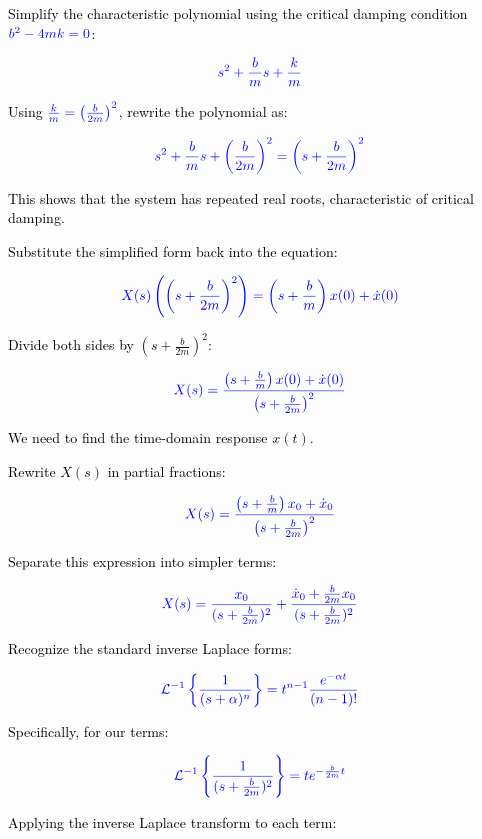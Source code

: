 \documentclass{article}
\begin{document}
\noindent
\textcolor{black}{Simplify the characteristic polynomial using the critical damping condition \(\textcolor{blue}{b^2 - 4mk = 0}\):}

\[
	\textcolor{blue}{s^2 + \frac{b}{m}s + \frac{k}{m}}
\]

\noindent
\textcolor{black}{Using \(\textcolor{blue}{\frac{k}{m} = \left(\frac{b}{2m}\right)^2}\), rewrite the polynomial as:}

\[
	\textcolor{blue}{s^2 + \frac{b}{m}s + \left(\frac{b}{2m}\right)^2 = \left(s + \frac{b}{2m}\right)^2}
\]

\noindent
\textcolor{black}{This shows that the system has repeated real roots, characteristic of critical damping.}

\noindent
\textcolor{black}{Substitute the simplified form back into the equation:}

\[
	\textcolor{blue}{X(s) \left( \left(s + \frac{b}{2m}\right)^2 \right) = \left(s + \frac{b}{m}\right)x(0) + \dot{x}(0)}
\]

\noindent
\textcolor{black}{Divide both sides by \(\left(s + \frac{b}{2m}\right)^2\):}

\[
	\textcolor{blue}{X(s) = \frac{\left(s + \frac{b}{m}\right)x(0) + \dot{x}(0)}{\left(s + \frac{b}{2m}\right)^2}}
\]

\noindent
\textcolor{black}{We need to find the time-domain response \( x(t) \).}

\noindent
\textcolor{black}{Rewrite \( X(s) \) in partial fractions:}

\[
	\textcolor{blue}{X(s) = \frac{\left(s + \frac{b}{m}\right)x_0 + \dot{x}_0}{\left(s + \frac{b}{2m}\right)^2}}
\]

\noindent
\textcolor{black}{Separate this expression into simpler terms:}

\[
	\textcolor{blue}{X(s) = \frac{x_0}{(s + \frac{b}{2m})^2} + \frac{\dot{x}_0 + \frac{b}{2m}x_0}{(s + \frac{b}{2m})^2}}
\]

\noindent
\textcolor{black}{Recognize the standard inverse Laplace forms:}

\[
	\textcolor{blue}{\mathcal{L}^{-1}\left\{\frac{1}{(s + \alpha)^n}\right\} = t^{n-1} \frac{e^{-\alpha t}}{(n-1)!}}
\]

\noindent
\textcolor{black}{Specifically, for our terms:}

\[
	\textcolor{blue}{\mathcal{L}^{-1}\left\{\frac{1}{(s + \frac{b}{2m})^2}\right\} = t e^{-\frac{b}{2m}t}}
\]

\noindent
\textcolor{black}{Applying the inverse Laplace transform to each term:}
\end{document}
